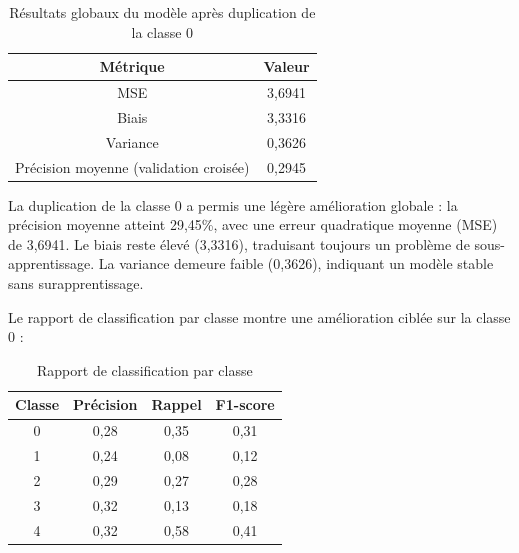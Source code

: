 \documentclass[a4paper,12pt]{article}
\begin{document}
\begin{table}[h]

\centering

\begin{tabular}{|c|c|}

\hline

\textbf{Métrique} & \textbf{Valeur} \\ \hline

MSE & 3,6941 \\ \hline

Biais & 3,3316 \\ \hline

Variance & 0,3626 \\ \hline

Précision moyenne (validation croisée) & 0,2945 \\ \hline

\end{tabular}

\caption{Résultats globaux du modèle après duplication de la classe 0}

\end{table}
 
La duplication de la classe 0 a permis une légère amélioration globale : la précision moyenne atteint 29,45\%, avec une erreur quadratique moyenne (MSE) de 3,6941. Le biais reste élevé (3,3316), traduisant toujours un problème de sous-apprentissage. La variance demeure faible (0,3626), indiquant un modèle stable sans surapprentissage.
 
\bigskip
 
Le rapport de classification par classe montre une amélioration ciblée sur la classe 0 :
 
\begin{table}[h]

\centering

\begin{tabular}{|c|c|c|c|}

\hline

\textbf{Classe} & \textbf{Précision} & \textbf{Rappel} & \textbf{F1-score} \\ \hline

0 & 0,28 & 0,35 & 0,31 \\ \hline

1 & 0,24 & 0,08 & 0,12 \\ \hline

2 & 0,29 & 0,27 & 0,28 \\ \hline

3 & 0,32 & 0,13 & 0,18 \\ \hline

4 & 0,32 & 0,58 & 0,41 \\ \hline

\end{tabular}

\caption{Rapport de classification par classe}

\end{table}
 
\end{document}

